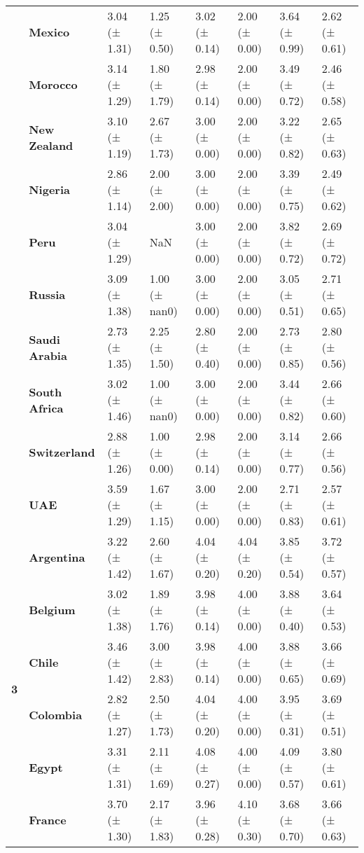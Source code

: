 \begin{longtable}{llllllll}
\textbf{} & \textbf{Mexico} & 3.04 (± 1.31) & 1.25 (± 0.50) & 3.02 (± 0.14) & 2.00 (± 0.00) & 3.64 (± 0.99) & 2.62 (± 0.61) \\
\textbf{} & \textbf{Morocco} & 3.14 (± 1.29) & 1.80 (± 1.79) & 2.98 (± 0.14) & 2.00 (± 0.00) & 3.49 (± 0.72) & 2.46 (± 0.58) \\
\textbf{} & \textbf{New Zealand} & 3.10 (± 1.19) & 2.67 (± 1.73) & 3.00 (± 0.00) & 2.00 (± 0.00) & 3.22 (± 0.82) & 2.65 (± 0.63) \\
\textbf{} & \textbf{Nigeria} & 2.86 (± 1.14) & 2.00 (± 2.00) & 3.00 (± 0.00) & 2.00 (± 0.00) & 3.39 (± 0.75) & 2.49 (± 0.62) \\
\textbf{} & \textbf{Peru} & 3.04 (± 1.29) & NaN & 3.00 (± 0.00) & 2.00 (± 0.00) & 3.82 (± 0.72) & 2.69 (± 0.72) \\
\textbf{} & \textbf{Russia} & 3.09 (± 1.38) & 1.00 (± nan0) & 3.00 (± 0.00) & 2.00 (± 0.00) & 3.05 (± 0.51) & 2.71 (± 0.65) \\
\textbf{} & \textbf{Saudi Arabia} & 2.73 (± 1.35) & 2.25 (± 1.50) & 2.80 (± 0.40) & 2.00 (± 0.00) & 2.73 (± 0.85) & 2.80 (± 0.56) \\
\textbf{} & \textbf{South Africa} & 3.02 (± 1.46) & 1.00 (± nan0) & 3.00 (± 0.00) & 2.00 (± 0.00) & 3.44 (± 0.82) & 2.66 (± 0.60) \\
\textbf{} & \textbf{Switzerland} & 2.88 (± 1.26) & 1.00 (± 0.00) & 2.98 (± 0.14) & 2.00 (± 0.00) & 3.14 (± 0.77) & 2.66 (± 0.56) \\
\textbf{} & \textbf{UAE} & 3.59 (± 1.29) & 1.67 (± 1.15) & 3.00 (± 0.00) & 2.00 (± 0.00) & 2.71 (± 0.83) & 2.57 (± 0.61) \\
\cline{1-8}
\multirow[t]{19}{*}{\textbf{3}} & \textbf{Argentina} & 3.22 (± 1.42) & 2.60 (± 1.67) & 4.04 (± 0.20) & 4.04 (± 0.20) & 3.85 (± 0.54) & 3.72 (± 0.57) \\
\textbf{} & \textbf{Belgium} & 3.02 (± 1.38) & 1.89 (± 1.76) & 3.98 (± 0.14) & 4.00 (± 0.00) & 3.88 (± 0.40) & 3.64 (± 0.53) \\
\textbf{} & \textbf{Chile} & 3.46 (± 1.42) & 3.00 (± 2.83) & 3.98 (± 0.14) & 4.00 (± 0.00) & 3.88 (± 0.65) & 3.66 (± 0.69) \\
\textbf{} & \textbf{Colombia} & 2.82 (± 1.27) & 2.50 (± 1.73) & 4.04 (± 0.20) & 4.00 (± 0.00) & 3.95 (± 0.31) & 3.69 (± 0.51) \\
\textbf{} & \textbf{Egypt} & 3.31 (± 1.31) & 2.11 (± 1.69) & 4.08 (± 0.27) & 4.00 (± 0.00) & 4.09 (± 0.57) & 3.80 (± 0.61) \\
\textbf{} & \textbf{France} & 3.70 (± 1.30) & 2.17 (± 1.83) & 3.96 (± 0.28) & 4.10 (± 0.30) & 3.68 (± 0.70) & 3.66 (± 0.63) \\

\end{longtable}
